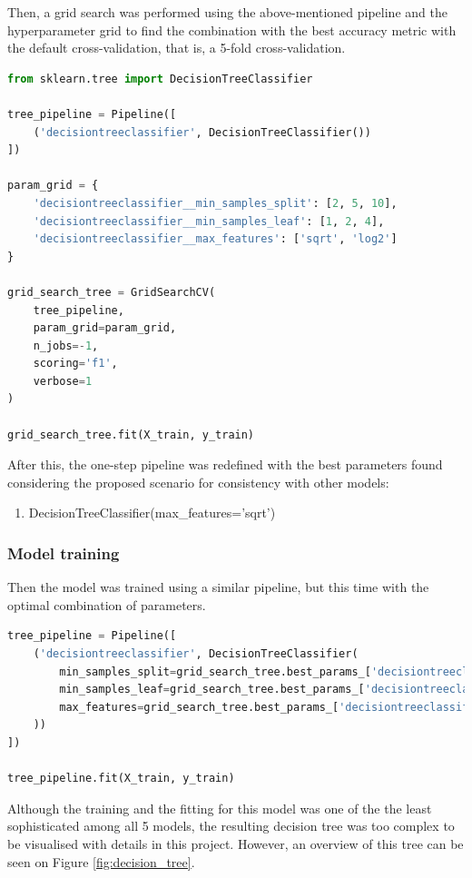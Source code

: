 \documentclass{article}
\begin{document}
Then, a grid search was performed using the above-mentioned pipeline and the hyperparameter grid to find the combination with the best accuracy metric with the default cross-validation, that is, a 5-fold cross-validation.
\begin{lstlisting}[language=Python]
from sklearn.tree import DecisionTreeClassifier

tree_pipeline = Pipeline([
    ('decisiontreeclassifier', DecisionTreeClassifier())
])

param_grid = {
    'decisiontreeclassifier__min_samples_split': [2, 5, 10],
    'decisiontreeclassifier__min_samples_leaf': [1, 2, 4],
    'decisiontreeclassifier__max_features': ['sqrt', 'log2']
}

grid_search_tree = GridSearchCV(
    tree_pipeline,
    param_grid=param_grid,
    n_jobs=-1,
    scoring='f1',
    verbose=1
)

grid_search_tree.fit(X_train, y_train)
\end{lstlisting}

After this, the one-step pipeline was redefined with the best parameters found considering the proposed scenario for consistency with other models:
\begin{enumerate}    
    \item DecisionTreeClassifier(max\_features='sqrt')
\end{enumerate}

\subsubsection{Model training}
Then the model was trained using a similar pipeline, but this time with the optimal combination of parameters.

\begin{lstlisting}[language=Python]
tree_pipeline = Pipeline([
    ('decisiontreeclassifier', DecisionTreeClassifier(
        min_samples_split=grid_search_tree.best_params_['decisiontreeclassifier__min_samples_split'],
        min_samples_leaf=grid_search_tree.best_params_['decisiontreeclassifier__min_samples_leaf'],
        max_features=grid_search_tree.best_params_['decisiontreeclassifier__max_features']
    ))
])

tree_pipeline.fit(X_train, y_train)
\end{lstlisting}

Although the training and the fitting for this model was one of the the least sophisticated among all 5 models, the resulting decision tree was too complex to be visualised with details in this project. However, an overview of this tree can be seen on Figure \ref{fig:decision_tree}.
\end{document}
